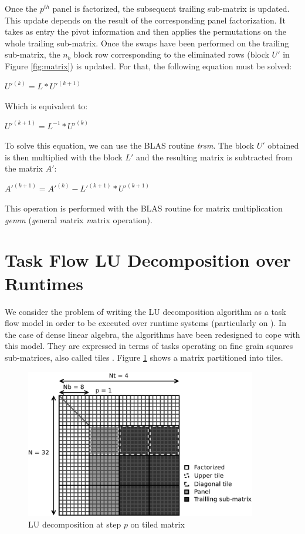 Once the $p^{th}$ panel is factorized, the subsequent trailing sub-matrix is updated. This update depends on the result of the corresponding panel factorization. It takes as entry the pivot information and then applies the permutations on the whole trailing sub-matrix. Once the swaps have been performed on the trailing sub-matrix, the $n_b$ block row corresponding to the eliminated rows (block $U'$ in Figure \ref{fig:matrix}) is updated. For that, the following equation must be solved:
\begin{center}
$U'^{(k)} = L*U'^{(k+1)}$
\end{center}
Which is equivalent to:
\begin{center}
$U'^{(k+1)} = L^{-1}*U'^{(k)}$
\end{center}
To solve this equation, we can use the BLAS routine \textit{trsm}. The block $U'$ obtained is then multiplied with the block $L'$ and the resulting matrix is subtracted from the matrix $A'$:
\begin{center}
$A'^{(k+1)} = A'^{(k)} - L'^{(k+1)}*U'^{(k+1)}$
\end{center}
This operation is performed with the BLAS routine for matrix multiplication \textit{gemm} (\emph{ge}neral \emph{m}atrix \emph{m}atrix operation).


\section{Task Flow LU Decomposition over Runtimes \label{task_flow_lu}}
We consider the problem of writing the LU decomposition algorithm as a task flow model in order to be executed over runtime systems (particularly on \dague). In the case of dense linear algebra, the algorithms have been redesigned to cope with this model. They are expressed in terms of tasks operating on fine grain squares sub-matrices, also called tiles \cite{conf/para/ButtariDKLLT06,ChanEtAl07b}. Figure \ref{fig:tiled_matrix} shows a matrix partitioned into tiles. 

\begin{figure}[!ht]
\centering
\includegraphics[width=0.9\textwidth]{figures/tiled_matrix.pdf}
\caption{LU decomposition at step $p$ on tiled matrix \label{fig:tiled_matrix}}
\end{figure}

